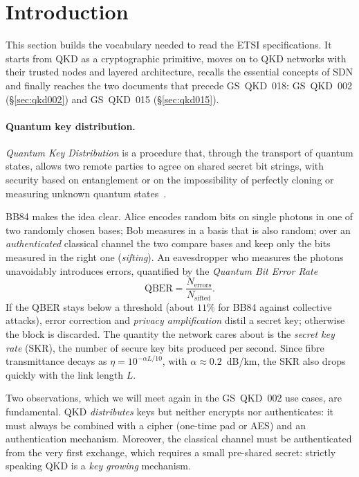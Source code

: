 \section{Introduction}
\label{sec:intro}

This section builds the vocabulary needed to read the ETSI specifications.
It starts from QKD as a cryptographic primitive, moves on to QKD networks
with their trusted nodes and layered architecture, recalls the essential
concepts of SDN and finally reaches the two documents that precede
GS~QKD~018: GS~QKD~002 (§\ref{sec:qkd002}) and GS~QKD~015
(§\ref{sec:qkd015}).

\paragraph{Quantum key distribution.}

\begin{definition}[QKD]
\emph{Quantum Key Distribution} is a procedure that, through the transport
of quantum states, allows two remote parties to agree on shared secret bit
strings, with security based on entanglement or on the impossibility of
perfectly cloning or measuring unknown quantum states~\cite{qkd018}.
\end{definition}

BB84 makes the idea clear. Alice encodes random bits on single photons in
one of two randomly chosen bases; Bob measures in a basis that is also
random; over an \emph{authenticated} classical channel the two compare bases
and keep only the bits measured in the right one (\emph{sifting}). An
eavesdropper who measures the photons unavoidably introduces errors,
quantified by the \emph{Quantum Bit Error Rate}
\begin{equation}
  \mathrm{QBER} = \frac{N_{\text{errors}}}{N_{\text{sifted}}} .
\end{equation}
If the QBER stays below a threshold (about $11\%$ for BB84 against
collective attacks), error correction and \emph{privacy amplification}
distil a secret key; otherwise the block is discarded. The quantity the
network cares about is the \emph{secret key rate} (SKR), the number of
secure key bits produced per second. Since fibre transmittance decays as
$\eta = 10^{-\alpha L/10}$, with $\alpha \approx 0.2$~dB/km, the SKR also
drops quickly with the link length $L$.

Two observations, which we will meet again in the GS~QKD~002 use cases,
are fundamental. QKD \emph{distributes} keys but neither encrypts nor
authenticates: it must always be combined with a cipher (one-time pad or
AES) and an authentication mechanism. Moreover, the classical channel must
be authenticated from the very first exchange, which requires a small
pre-shared secret: strictly speaking QKD is a \emph{key growing} mechanism.

